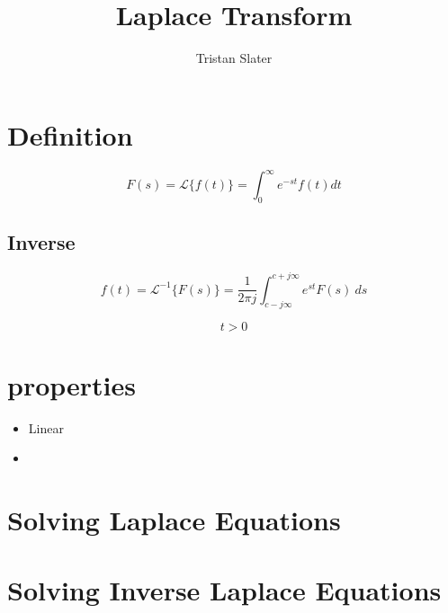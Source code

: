 \documentclass{article}
\title{Laplace Transform}
\author{Tristan Slater}
\begin{document}
    \maketitle

    \tableofcontents
    
    \section{Definition}

    \begin{equation}
        F(s) = \mathscr{L}\{f(t)\} = \int_0^\infty{e^{-st} f(t) dt}
    \end{equation}

    \subsection{Inverse}

    \begin{equation}
        f(t) = \mathscr{L}^{-1}\{F(s)\} = \frac{1}{2\pi j}\int_{c - j\infty}^{c + j\infty}{e^{st}F(s)\ ds}
    \end{equation}
    
    $$t > 0$$

    \section{properties}

    \begin{itemize}
        \item Linear
        \item 
    \end{itemize}

    \section{Solving Laplace Equations}
    
    \section{Solving Inverse Laplace Equations}
    
\end{document}
